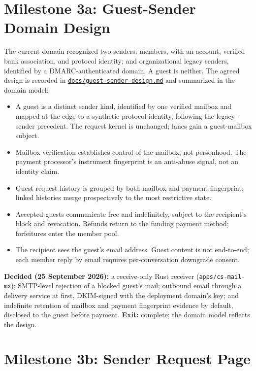 \documentclass[11pt]{article}
\begin{document}
\section{Milestone 3a: Guest-Sender Domain Design}

The current domain recognized two senders: members, with an account, verified
bank association, and protocol identity; and organizational legacy senders,
identified by a DMARC-authenticated domain. A guest is neither. The agreed design
is recorded in \href{docs/guest-sender-design.md}{\texttt{docs/guest-sender-design.md}}
and summarized in the domain model:

\begin{itemize}
    \item A guest is a distinct sender kind, identified by one verified mailbox
    and mapped at the edge to a synthetic protocol identity, following the
    legacy-sender precedent. The request kernel is unchanged; lanes gain a
    guest-mailbox subject.
    \item Mailbox verification establishes control of the mailbox, not
    personhood. The payment processor's instrument fingerprint is an anti-abuse
    signal, not an identity claim.
    \item Guest request history is grouped by both mailbox and payment
    fingerprint; linked histories merge prospectively to the most restrictive
    state.
    \item Accepted guests communicate free and indefinitely, subject to the
    recipient's block and revocation. Refunds return to the funding payment
    method; forfeitures enter the member pool.
    \item The recipient sees the guest's email address. Guest content is not
    end-to-end; each member reply by email requires per-conversation downgrade
    consent.
\end{itemize}

\textbf{Decided (25 September 2026):} a receive-only Rust receiver
(\texttt{apps/cs-mail-mx}); SMTP-level rejection of a blocked guest's mail;
outbound email through a delivery service at first, DKIM-signed with the
deployment domain's key; and indefinite retention of mailbox and payment
fingerprint evidence by default, disclosed to the guest before payment.
\textbf{Exit:} complete; the domain model reflects the design.

\section{Milestone 3b: Sender Request Page}
\end{document}
